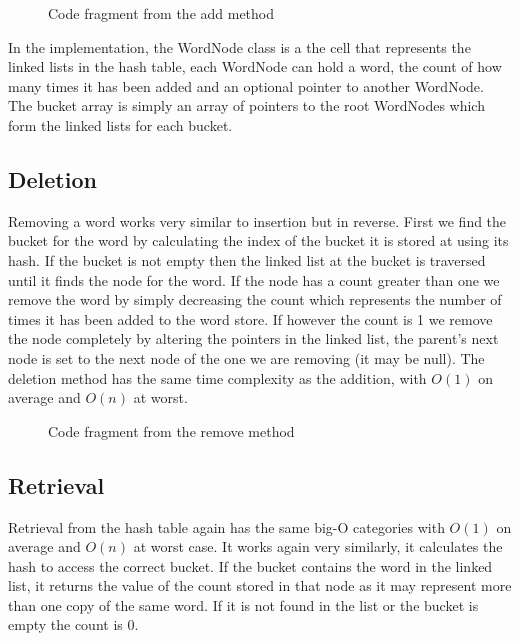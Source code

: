 \documentclass[12pt]{article}
\begin{document}
\begin{figure}[!htp]
\centering
{}
\caption{Code fragment from the add method}
\label{lst:addition_method}
\end{figure}

In the implementation, the WordNode class is a the cell that represents the linked lists in the hash table, each WordNode can hold a word, the count of how many times it has been added and an optional pointer to another WordNode. The bucket array is simply an array of pointers to the root WordNodes which form the linked lists for each bucket.

\subsection{Deletion}
Removing a word works very similar to insertion but in reverse. First we find the bucket for the word by calculating the index of the bucket it is stored at using its hash. If the bucket is not empty then the linked list at the bucket is traversed until it finds the node for the word. If the node has a count greater than one we remove the word by simply decreasing the count which represents the number of times it has been added to the word store. If however the count is 1 we remove the node completely by altering the pointers in the linked list, the parent's next node is set to the next node of the one we are removing (it may be null). The deletion method has the same time complexity as the addition, with $O(1)$ on average and $O(n)$ at worst.

\begin{figure}[!htp]
\centering
{}
\caption{Code fragment from the remove method}
\label{lst:remove_method}
\end{figure}

\subsection{Retrieval}
Retrieval from the hash table again has the same big-O categories with $O(1)$ on average and $O(n)$ at worst case. It works again very similarly, it calculates the hash to access the correct bucket. If the bucket contains the word in the linked list, it returns the value of the count stored in that node as it may represent more than one copy of the same word. If it is not found in the list or the bucket is empty the count is 0.
\end{document}
